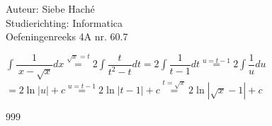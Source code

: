 \documentclass[a4paper]{article}
\begin{document}
  
\noindent \large Auteur: Siebe Haché \\
\noindent \large Studierichting: Informatica\\
\noindent \large Oefeningenreeks 4A nr. 60.7\\

\medskip

\normalsize


$ \displaystyle\int \dfrac{1}{\ x-\sqrt{x}} dx \stackrel{\sqrt{x}= t}{=} 2 \displaystyle\int \dfrac{t}{t^2-t} dt
= 2\displaystyle\int \dfrac{1}{t - 1}dt \stackrel{u = t - 1}{=}  2\displaystyle\int \dfrac{1}{u}du$\\

$ = 2\ln| u | + c  \stackrel{u = t - 1}{=} 2\ln| t - 1 | + c  \stackrel{t = \sqrt{x}}{=} 2\ln| \sqrt{x} - 1 | + c$\\
										


\begin{thebibliography}{999}
\end{thebibliography}
\end{document}
